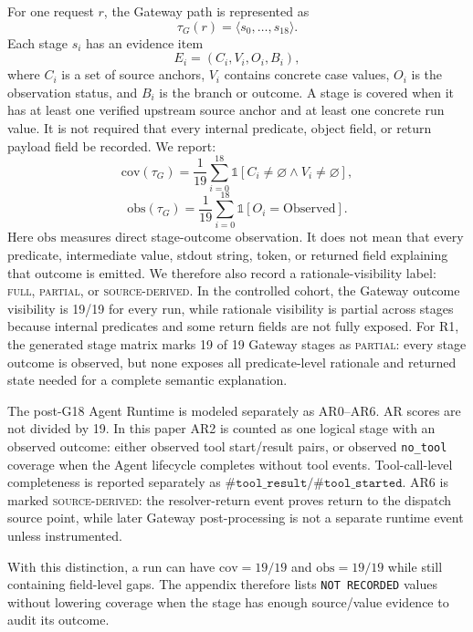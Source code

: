 \documentclass[11pt,a4paper]{article}
\begin{document}
For one request \(r\), the Gateway path is represented as
\[
    \tau_G(r)=\langle s_0,\ldots,s_{18}\rangle .
\]
Each stage \(s_i\) has an evidence item
\[
    E_i=(C_i,V_i,O_i,B_i),
\]
where \(C_i\) is a set of source anchors, \(V_i\) contains concrete case
values, \(O_i\) is the observation status, and \(B_i\) is the branch or
outcome. A stage is covered when it has at least one verified upstream
source anchor and at least one concrete run value. It is not required
that every internal predicate, object field, or return payload field be
recorded. We report:
\[
    \mathrm{cov}(\tau_G)=
    \frac{1}{19}\sum_{i=0}^{18}
    \mathbb{1}[C_i\neq\varnothing \wedge V_i\neq\varnothing],
\]
\[
    \mathrm{obs}(\tau_G)=
    \frac{1}{19}\sum_{i=0}^{18}
    \mathbb{1}[O_i=\mathrm{Observed}].
\]
Here \(\mathrm{obs}\) measures direct stage-outcome observation. It does
not mean that every predicate, intermediate value, stdout string, token,
or returned field explaining that outcome is emitted. We therefore also
record a rationale-visibility label: \textsc{full},
\textsc{partial}, or \textsc{source-derived}. In the controlled cohort,
the Gateway outcome visibility is 19/19 for every run, while rationale
visibility is partial across stages because internal predicates and some
return fields are not fully exposed. For R1, the generated stage matrix
marks 19 of 19 Gateway stages as \textsc{partial}: every stage outcome is
observed, but none exposes all predicate-level rationale and returned
state needed for a complete semantic explanation.

The post-G18 Agent Runtime is modeled separately as AR0--AR6. AR scores
are not divided by 19. In this paper AR2 is counted as one logical stage
with an observed outcome: either observed tool start/result pairs, or
observed \texttt{no\_tool} coverage when the Agent lifecycle completes
without tool events. Tool-call-level completeness is reported separately
as \(\#\texttt{tool\_result}/\#\texttt{tool\_started}\). AR6 is marked
\textsc{source-derived}: the resolver-return event proves return to the
dispatch source point, while later Gateway post-processing is not a
separate runtime event unless instrumented.

With this distinction, a run can have \(\mathrm{cov}=19/19\) and
\(\mathrm{obs}=19/19\) while still containing field-level gaps. The
appendix therefore lists
\texttt{NOT RECORDED} values without lowering coverage when the stage has
enough source/value evidence to audit its outcome.
\end{document}
